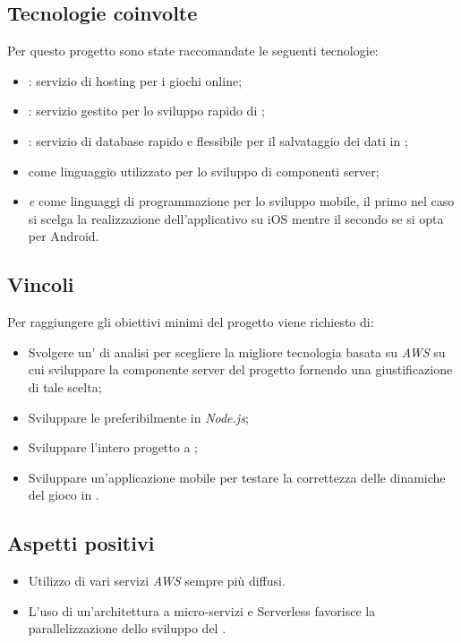 \subsection{Tecnologie coinvolte}
Per questo progetto sono state raccomandate le seguenti tecnologie:
\begin{itemize}
	\item \textit{}: servizio di hosting per i giochi online;
	\item \textit{}: servizio gestito per lo sviluppo rapido di \textit{};
	\item \textit{}: servizio di database \textit{} rapido e flessibile per il salvataggio dei dati in ;
	\item \textit{} come linguaggio utilizzato per lo sviluppo di componenti server;
	\item \textit{ e } come linguaggi di programmazione per lo sviluppo mobile, il primo nel caso si scelga la realizzazione dell'applicativo su iOS mentre il secondo se si opta per Android.
\end{itemize}

\subsection{Vincoli}
Per raggiungere gli obiettivi minimi del progetto viene richiesto di:
\begin{itemize}
	\item Svolgere un' di analisi per scegliere la migliore tecnologia basata su \textit{AWS} su cui sviluppare la componente server del progetto fornendo una giustificazione di tale scelta;
	\item Sviluppare le  preferibilmente in \textit{Node.js};
	\item Sviluppare l'intero progetto a ;
	\item Sviluppare un'applicazione mobile per testare la correttezza delle dinamiche del gioco in .
\end{itemize}

 \subsection{Aspetti positivi}
\begin{itemize}
	\item Utilizzo di vari servizi \textit{AWS} sempre più diffusi.
	\item L'uso di un'architettura a micro-servizi e Serverless favorisce la parallelizzazione dello sviluppo del .
\end{itemize}

